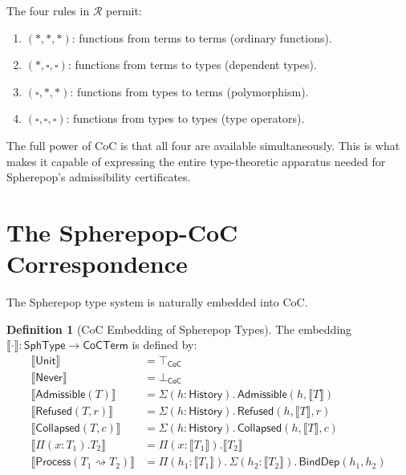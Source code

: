 \documentclass[12pt, a4paper, openany]{book}
\theoremstyle{plain}
\theoremstyle{definition}
\newtheorem{definition}[theorem]{Definition}
\theoremstyle{remark}
\newcommand{\Adm}{\mathsf{Admissible}}
\newcommand{\Rfsd}{\mathsf{Refused}}
\newcommand{\Col}{\mathsf{Collapsed}}
\newcommand{\Proc}{\mathsf{Process}}
\begin{document}
The four rules in $\mathcal{R}$ permit:
\begin{enumerate}
\item $(\ast, \ast, \ast)$: functions from terms to terms (ordinary functions).
\item $(\ast, \square, \square)$: functions from terms to types (dependent types).
\item $(\square, \ast, \ast)$: functions from types to terms (polymorphism).
\item $(\square, \square, \square)$: functions from types to types (type operators).
\end{enumerate}

The full power of CoC is that all four are available simultaneously. This is what
makes it capable of expressing the entire type-theoretic apparatus needed for
Spherepop's admissibility certificates.

\section{The Spherepop-CoC Correspondence}

The Spherepop type system is naturally embedded into CoC.

\begin{definition}[CoC Embedding of Spherepop Types]
The embedding $\llbracket \cdot \rrbracket : \mathsf{SphType} \to \mathsf{CoCTerm}$
is defined by:
\begin{align*}
\llbracket \mathsf{Unit} \rrbracket &= \top_{\mathsf{CoC}} \\
\llbracket \mathsf{Never} \rrbracket &= \bot_{\mathsf{CoC}} \\
\llbracket \Adm(T) \rrbracket &= \Sigma(h : \mathsf{History}).\, \mathsf{Admissible}(h, \llbracket T \rrbracket) \\
\llbracket \Rfsd(T, r) \rrbracket &= \Sigma(h : \mathsf{History}).\, \mathsf{Refused}(h, \llbracket T \rrbracket, r) \\
\llbracket \Col(T, c) \rrbracket &= \Sigma(h : \mathsf{History}).\, \mathsf{Collapsed}(h, \llbracket T \rrbracket, c) \\
\llbracket \Pi(x : T_1).T_2 \rrbracket &= \Pi(x : \llbracket T_1 \rrbracket).\llbracket T_2 \rrbracket \\
\llbracket \Proc(T_1 \rightsquigarrow T_2) \rrbracket &=
  \Pi(h_1 : \llbracket T_1 \rrbracket).\, \Sigma(h_2 : \llbracket T_2 \rrbracket).\,
  \mathsf{BindDep}(h_1, h_2)
\end{align*}
\end{definition}
\end{document}
